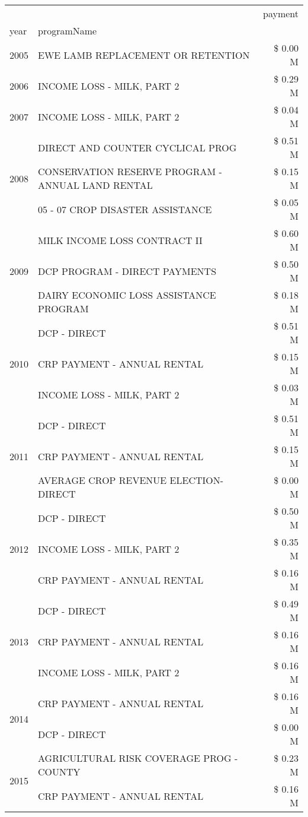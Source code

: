 \begin{tabular}{llr}
\toprule
 &  & payment \\
year & programName &  \\
\midrule
2005 & EWE LAMB REPLACEMENT OR RETENTION & \$ 0.00 M \\
\cline{1-3}
2006 & INCOME LOSS - MILK, PART 2 & \$ 0.29 M \\
\cline{1-3}
2007 & INCOME LOSS - MILK, PART 2 & \$ 0.04 M \\
\cline{1-3}
\multirow[t]{3}{*}{2008} & DIRECT AND COUNTER CYCLICAL PROG & \$ 0.51 M \\
 & CONSERVATION RESERVE PROGRAM - ANNUAL LAND RENTAL & \$ 0.15 M \\
 & 05 - 07 CROP DISASTER ASSISTANCE & \$ 0.05 M \\
\cline{1-3}
\multirow[t]{3}{*}{2009} & MILK INCOME LOSS CONTRACT II & \$ 0.60 M \\
 & DCP PROGRAM - DIRECT PAYMENTS & \$ 0.50 M \\
 & DAIRY ECONOMIC LOSS ASSISTANCE PROGRAM & \$ 0.18 M \\
\cline{1-3}
\multirow[t]{3}{*}{2010} & DCP - DIRECT & \$ 0.51 M \\
 & CRP PAYMENT - ANNUAL RENTAL & \$ 0.15 M \\
 & INCOME LOSS - MILK, PART 2 & \$ 0.03 M \\
\cline{1-3}
\multirow[t]{3}{*}{2011} & DCP - DIRECT & \$ 0.51 M \\
 & CRP PAYMENT - ANNUAL RENTAL & \$ 0.15 M \\
 & AVERAGE CROP REVENUE ELECTION-DIRECT & \$ 0.00 M \\
\cline{1-3}
\multirow[t]{3}{*}{2012} & DCP - DIRECT & \$ 0.50 M \\
 & INCOME LOSS - MILK, PART 2 & \$ 0.35 M \\
 & CRP PAYMENT - ANNUAL RENTAL & \$ 0.16 M \\
\cline{1-3}
\multirow[t]{3}{*}{2013} & DCP - DIRECT & \$ 0.49 M \\
 & CRP PAYMENT - ANNUAL RENTAL & \$ 0.16 M \\
 & INCOME LOSS - MILK, PART 2 & \$ 0.16 M \\
\cline{1-3}
\multirow[t]{2}{*}{2014} & CRP PAYMENT - ANNUAL RENTAL & \$ 0.16 M \\
 & DCP - DIRECT & \$ 0.00 M \\
\cline{1-3}
\multirow[t]{3}{*}{2015} & AGRICULTURAL RISK COVERAGE PROG - COUNTY & \$ 0.23 M \\
 & CRP PAYMENT - ANNUAL RENTAL & \$ 0.16 M \\

\end{tabular}
